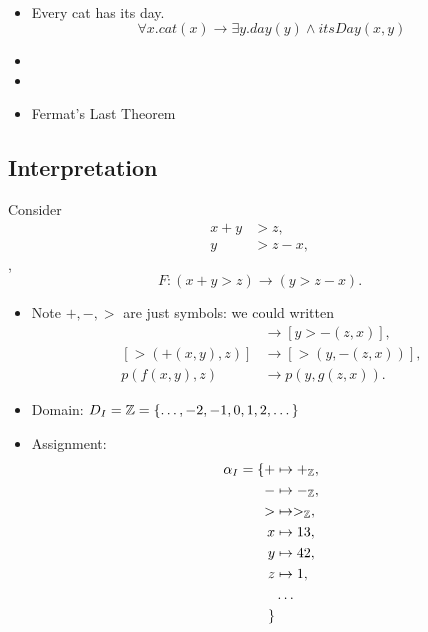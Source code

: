\begin{example}
\ \begin{itemize}
	\item Every cat has its day. \[
	\forall x.cat(x)\to\exists y.day(y)\land itsDay(x,y)
	\]
	\item 
	\item 
	\item Fermat's Last Theorem
\end{itemize}
\end{example}

\subsection{Interpretation}
\begin{observation}
Consider \begin{align*}
	x + y &> z, \\
	y &> z-x,
\end{align*} \ie, \[
F:(x+y>z)\to (y>z-x).
\]
\begin{itemize}
	\item Note $+,-,>$ are just symbols: we could written \begin{align*}
		[+(x,y) > z] &\to [y > -(z,x)], \\
		[> (+(x,y), z)] &\to [> (y, -(z,x))], \\
		p (f(x,y), z) &\to p(y, g(z,x)).
	\end{align*}
	\item Domain: $D_I=\mathbb{Z}=\set{\dots,-2,-1,0,1,2,\dots}$
	\item Assignment: \begin{align*}
		\alpha_I = \{
		+ &\mapsto +_{\mathbb{Z}}, \\
		- &\mapsto -_{\mathbb{Z}}, \\
		> &\mapsto >_{\mathbb{Z}}, \\
		x &\mapsto 13, \\
		y &\mapsto 42, \\
		z &\mapsto 1, \\
		&\dots\\ \}
	\end{align*}
\end{itemize}
\end{observation}

